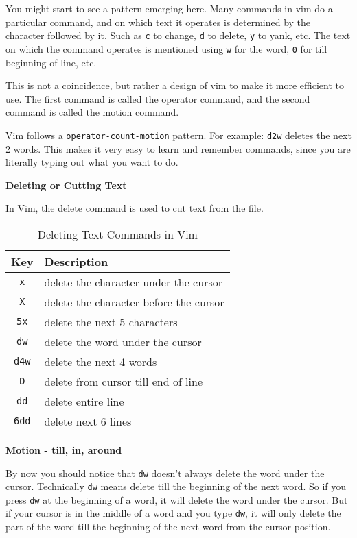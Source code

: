 You might start to see a pattern emerging here.
Many commands in vim do a particular command,
and on which text it operates is determined by
the character followed by it. Such as \lstinline|c|
to change, \lstinline|d| to delete, \lstinline|y| to yank,
etc. The text on which the command operates is
mentioned using \lstinline|w| for the word, \lstinline|0|
for till beginning of line, etc.

This is not a coincidence, but rather a design
of vim to make it more efficient to use.
The first command is called the operator command,
and the second command is called the motion command.

Vim follows a \lstinline|operator-count-motion| pattern.
For example: \lstinline|d2w| deletes the next 2 words.
This makes it very easy to learn and remember commands,
since you are literally typing out what you want to do.

\textbf{Deleting or Cutting Text}

In Vim, the delete command is used to cut text from the file.

\begin{table}[h!]
  \caption{Deleting Text Commands in Vim}
  \begin{tabular}{c l}
    \toprule
    Key & Description \\
    \midrule
    \lstinline|x| & delete the character under the cursor \\
    \lstinline|X| & delete the character before the cursor \\
    \lstinline|5x| & delete the next 5 characters \\
    \lstinline|dw| & delete the word under the cursor \\
    \lstinline|d4w| & delete the next 4 words \\
    \lstinline|D| & delete from cursor till end of line \\
    \lstinline|dd| & delete entire line \\
    \lstinline|6dd| & delete next 6 lines \\
    \bottomrule
  \end{tabular}
\end{table}

\textbf{Motion - till, in, around}

By now you should notice that \lstinline|dw| doesn't always
delete the word under the cursor. Technically \lstinline|dw|
means delete till the beginning of the next word.
So if you press \lstinline|dw| at the beginning of a word,
it will delete the word under the cursor. But if your
cursor is in the middle of a word and you type \lstinline|dw|,
it will only delete the part of the word till the beginning
of the next word from the cursor position.

